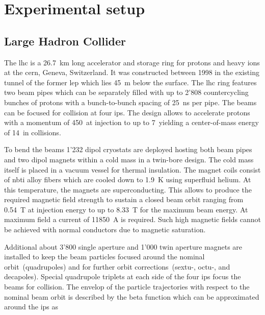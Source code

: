 \chapter{Experimental setup}


\section{Large Hadron Collider}

The \gls{lhc} is a 26.7~km long accelerator and storage ring for protons and heavy ions at the \gls{cern}, Geneva, Switzerland. It was constructed between 1998 in the existing tunnel of the former \gls{lep} which lies 45~m below the surface. The \gls{lhc} ring features two beam pipes which can be separately filled with up to 2'808 countercycling bunches of protons with a bunch-to-bunch spacing of 25~ns per pipe. The beams can be focused for collision at four \glspl{ip}. The design allows to accelerate protons with a momentum of 450~\GeV at injection to up to 7~\TeV yielding a center-of-mass energy of 14~\TeV in collisions.

To bend the beams 1'232 dipol cryostats are deployed hosting both beam pipes and two dipol magnets within a cold mass in a twin-bore design. The cold mass itself is placed in a vacuum vessel for thermal insulation. The magnet coils consist of \gls{nbti} alloy fibers which are cooled down to 1.9~K using superfluid helium. At this temperature, the magnets are superconducting. This allows to produce the required magnetic field strength to sustain a closed beam orbit ranging from 0.54~T at injection energy to up to 8.33~T for the maximum beam energy. At maximum field a current of 11850~A is required. Such high magnetic fields cannot be achieved with normal conductors due to magnetic saturation. 

Additional about 3'800 single aperture and 1'000 twin aperture magnets are installed to keep the beam particles focused around the nominal orbit~(quadrupoles) and for further orbit corrections~(sextu-, octu-, and decapoles). Special quadrupole triplets at each side of the four \glspl{ip} focus the beams for collision. The envelop of the particle trajectories with respect to the nominal beam orbit is described by the beta function which can be approximated around the \glspl{ip} as 

